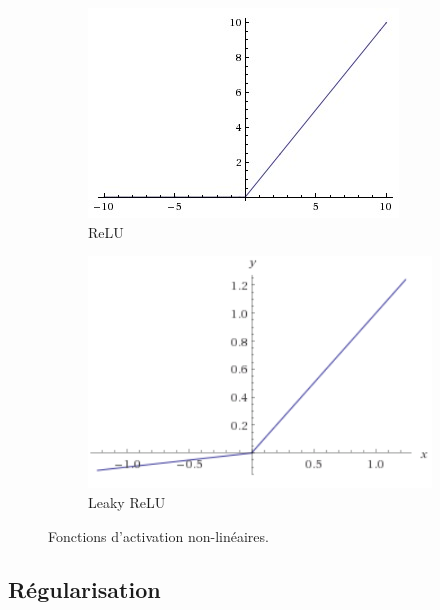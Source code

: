 \begin{figure}[!htb]
	\begin{subfigure}{0.49\textwidth}
		\includegraphics[width=\linewidth]{figures/relu.jpeg}
		\caption{ReLU} \label{fig:relu}
	\end{subfigure}
	\begin{subfigure}{0.49\textwidth}
		\includegraphics[width=\linewidth]{figures/lrelu.png}
		\caption{Leaky ReLU~\cite{he2015delving}} \label{fig:lrelu}
	\end{subfigure}
	\caption{Fonctions d'activation non-linéaires.}
	\label{fig:activation}
\end{figure}




\subsection{Régularisation}
\label{sec:regularisation}

